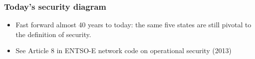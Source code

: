 \documentclass[compress]{beamer}
\begin{document}
\begin{frame}
  \frametitle{Today's security diagram}
  \begin{itemize}
  \item Fast forward almost 40 years to today: the same five states are still pivotal to the definition of security.
  \item See Article 8 in ENTSO-E network code on operational security (2013)
  \end{itemize}

\end{frame}
\end{document}
